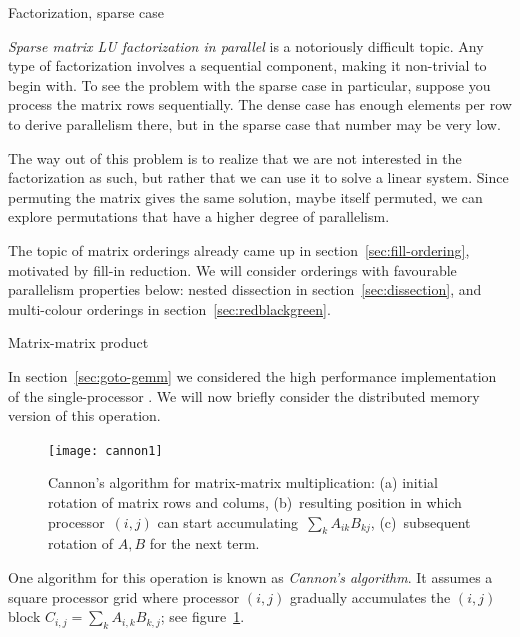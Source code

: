 

 {Factorization, sparse case}

\emph{Sparse matrix LU factorization in parallel} is a notoriously
difficult topic. Any type of factorization involves a sequential
component, making it non-trivial to begin with. To see the problem
with the sparse case in particular, suppose you process
the matrix rows sequentially. The dense case has enough elements per
row to derive parallelism there, but in the sparse case that number
may be very low.

The way out of this problem is to realize that we are not interested
in the factorization as such, but rather that we can use it to solve a
linear system. Since permuting the matrix gives the same solution,
maybe itself permuted, we can explore permutations that have a higher
degree of parallelism.

The topic of matrix orderings already came up in
section~\ref{sec:fill-ordering}, motivated by fill-in reduction.
We will consider orderings with favourable parallelism properties
below: nested dissection in section~\ref{sec:dissection}, and
multi-colour orderings in section~\ref{sec:redblackgreen}.


{} {Matrix-matrix product}

In section~\ref{sec:goto-gemm} we considered the high performance
implementation of the single-processor .  We will now briefly consider the distributed memory
version of this operation.

\begin{figure}
  \texttt{[image: cannon1]}
  \caption{Cannon's algorithm for matrix-matrix multiplication: (a) initial rotation of matrix rows and colums, (b)~resulting position in which processor~$(i,j)$ can start accumulating~$\sum_kA_{ik}B_{kj}$, (c)~subsequent rotation of $A,B$ for the next term.}
  \label{fig:cannon}
\end{figure}
%
One algorithm for this operation is known as
\emph{Cannon's algorithm}.
It assumes a square processor grid where processor $(i,j)$ gradually
accumulates the $(i,j)$ block $C_{i,j}=\sum_kA_{i,k}B_{k,j}$;
see figure~\ref{fig:cannon}.

